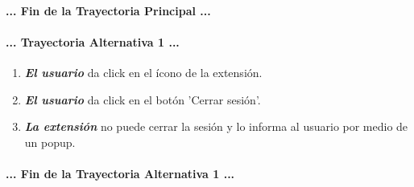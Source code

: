 \documentclass[12pt, a4paper, titlepage]{report}
\begin{document}
				\paragraph{... Fin de la Trayectoria Principal ...}
				
				\paragraph{... Trayectoria Alternativa 1 ...}
				\begin{enumerate}
				
					\item \textbf{\textit{El usuario}} da click en el ícono de la extensión.
					
					\item \textbf{\textit{El usuario}} da click en el botón 'Cerrar sesión'.
					
					\item \textbf{\textit{La extensión}} no puede cerrar la sesión y lo informa al usuario por medio de un popup.
					
				\end{enumerate}
				\paragraph{... Fin de la Trayectoria Alternativa 1 ...}
				\newpage
				
				
				
\end{document}
